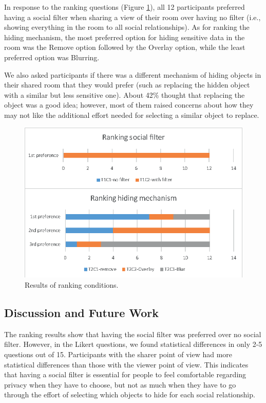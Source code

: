 In response to the ranking questions (Figure \ref{fig:frontier18:result-ranking}), all 12 participants preferred having a social filter when sharing a view of their room over having no filter (i.e., showing everything in the room to all social relationships). As for ranking the hiding mechanism, the most preferred option for hiding sensitive data in the room was the Remove option followed by the Overlay option, while the least preferred option was Blurring. 

We also asked participants if there was a different mechanism of hiding objects in their shared room that they would prefer (such as replacing the hidden object with a similar but less sensitive one). About 42\% thought that replacing the object was a good idea; however, most of them raised concerns about how they may not like the additional effort needed for selecting a similar object to replace.

\begin{figure}
\begin{center}
\includegraphics[width=0.8\linewidth]{images/frontier18/images-07.eps}
\caption{Results of ranking conditions.}\label{fig:frontier18:result-ranking}
\end{center}
\end{figure}

\subsection{Discussion and Future Work}

The ranking results show that having the social filter was preferred over no social filter. However, in the Likert questions, we found statistical differences in only 2-5 questions out of 15. Participants with the sharer point of view had more statistical differences than those with the viewer point of view. This indicates that having a social filter is essential for people to feel comfortable regarding privacy when they have to choose, but not as much when they have to go through the effort of selecting which objects to hide for each social relationship.  


